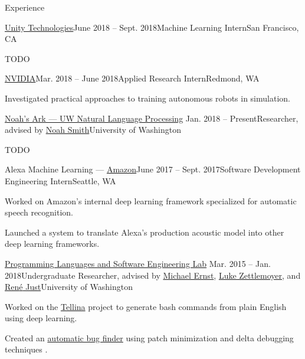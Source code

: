 \documentclass{resume}
\begin{document}
\begin{rSection}{Experience}
  \begin{rSubsection}{{\href{https://unity3d.com/}{Unity Technologies}}}{June 2018 -- Sept. 2018}{Machine Learning Intern}{San Francisco, CA}
    \item TODO
  \end{rSubsection}

  \begin{rSubsection}{{\href{http://www.nvidia.com/page/home.html}{NVIDIA}}}{Mar. 2018 -- June 2018}{Applied Research Intern}{Redmond, WA}
    \item Investigated practical approaches to training autonomous robots in simulation.
  \end{rSubsection}

  \begin{rSubsection}{\href{http://www.ark.cs.washington.edu/}{Noah's Ark --- UW Natural Language Processing}}
    {Jan. 2018 -- Present}{Researcher, advised by \href{https://homes.cs.washington.edu/~nasmith/}{Noah Smith}}{University of Washington}
    \item TODO
  \end{rSubsection}

  \begin{rSubsection}{Alexa Machine Learning --- {\href{https://www.amazon.com/}{Amazon}}}{June 2017 -- Sept. 2017}{Software Development Engineering Intern}{Seattle, WA}
    \item Worked on Amazon's internal deep learning framework specialized for automatic
    speech recognition.
    \item Launched a system to translate Alexa's production acoustic model into other deep learning frameworks.
  \end{rSubsection}

  \begin{rSubsection}{\href{https://uwplse.org/}{Programming Languages and Software Engineering Lab}}
    {Mar. 2015 -- Jan. 2018}{Undergraduate Researcher, advised by \href{https://homes.cs.washington.edu/~mernst/}{Michael Ernst}, \href{https://www.cs.washington.edu/people/faculty/lsz}{Luke Zettlemoyer}, and \href{https://people.cs.umass.edu/~rjust/}{Ren{\'e} Just}}{University of Washington}
  \item Worked on the \href{https://github.com/TellinaTool}{Tellina} project \citep{LinWPVZE2017:TR} to generate bash commands from plain English using deep learning.
  \item Created an \href{https://github.com/dericp/patch-minimization}{automatic bug finder} using patch minimization and delta debugging techniques \citep{PearsonCJFAEPK2017}.
  \end{rSubsection}
  

\end{rSection}
\end{document}
